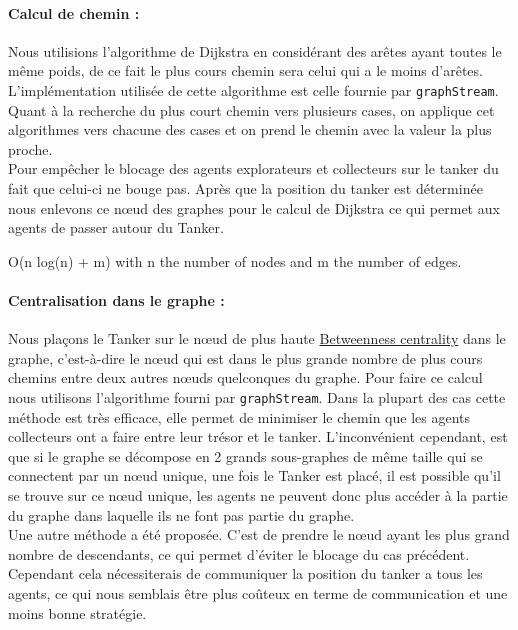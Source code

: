 \documentclass[10pt]{article}
\newcommand\tab[1][0.65cm]{\hspace*{#1}}
\begin{document}
\paragraph{Calcul de chemin :} Nous utilisions l'algorithme de Dijkstra en considérant des arêtes ayant toutes le même poids, de ce fait le plus cours chemin sera celui qui a le moins d'arêtes. L'implémentation utilisée de cette algorithme est celle fournie par \texttt{graphStream}. Quant à la recherche du plus court chemin vers plusieurs cases, on applique cet algorithmes vers chacune des cases et on prend le chemin avec la valeur la plus proche.\\
\tab Pour empêcher le blocage des agents explorateurs et collecteurs sur le tanker du fait que celui-ci ne bouge pas. Après que la position du tanker est déterminée nous enlevons ce nœud des graphes pour le calcul de Dijkstra ce qui permet aux agents de passer autour du Tanker.

O(n log(n) + m) with n the number of nodes and m the number of edges.



\paragraph{Centralisation dans le graphe :} Nous plaçons le Tanker sur le nœud de plus haute \href{https://en.wikipedia.org/wiki/Betweenness_centrality}{Betweenness centrality} dans le graphe, c'est-à-dire le nœud  qui est dans le plus grande nombre de plus cours chemins entre deux autres nœuds quelconques du graphe. Pour faire ce calcul nous utilisons l'algorithme fourni par \texttt{graphStream}. Dans la plupart des cas cette méthode est très efficace, elle permet de minimiser le chemin que les agents collecteurs ont a faire entre leur trésor et le tanker. L'inconvénient cependant, est que si le graphe se décompose en 2 grands sous-graphes de même taille qui se connectent par un nœud unique, une fois le Tanker est placé, il est possible qu'il se trouve sur ce nœud unique, les agents ne peuvent donc plus accéder à la partie du graphe dans laquelle ils ne font pas partie du graphe.\\
\tab Une autre méthode a été proposée. C'est de prendre le nœud ayant les plus grand nombre de descendants, ce qui permet d'éviter le blocage du cas précédent. Cependant cela nécessiterais de communiquer la position du tanker a tous les agents, ce qui nous semblais être plus coûteux en terme de communication et une moins bonne stratégie.
\end{document}
